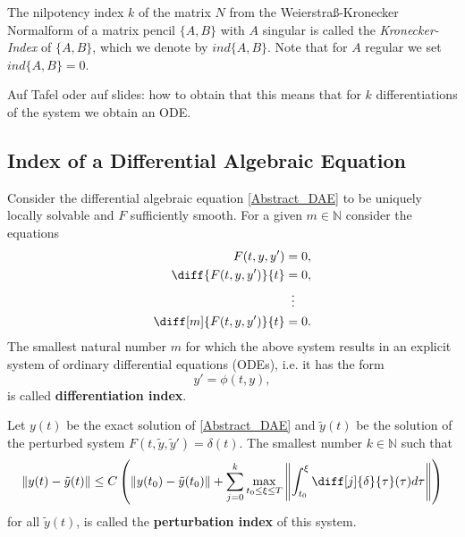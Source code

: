 	\begin{frame}
		\begin{definition}
			The nilpotency index $k$ of the matrix $N$ from the Weierstraß-Kronecker Normalform of a matrix pencil $\{A,B\}$ with $A$ singular is called the \emph{Kronecker-Index} of $\{A,B\}$, which we denote by $ind\{A,B\}$. Note that for $A$ regular we set $ind\{A,B\} = 0$.
		\end{definition}
		
		Auf Tafel oder auf slides: how to obtain that this means that for $k$ differentiations of the system we obtain an ODE.
	\end{frame}
	
	
	
	\subsection{Index of a Differential Algebraic Equation}
	
	\begin{frame}
		\begin{definition}%
			Consider the differential algebraic equation \eqref{Abstract_DAE} to be uniquely locally solvable and $F$ sufficiently smooth. For a given $m \in \mathbb{N}$ consider the equations
			\begin{displaymath}
				\begin{aligned}
					F(t,y,y') &= 0, \\
					\diff{F(t,y,y')}{t} &= 0, \\
					&\vdotswithin{=} \\
					\diff[m]{F(t,y,y')}{t} &= 0.
				\end{aligned}
			\end{displaymath}
			The smallest natural number $m$ for which the above system results in an explicit system of ordinary differential equations (ODEs), i.e. it has the form
			\begin{displaymath}
				y' = \phi(t,y),
			\end{displaymath}
			is called \textbf{differentiation index}.
		\end{definition}
	\end{frame}

	\begin{frame}
		\vfill
		\begin{definition}%
			Let $y(t)$ be the exact solution of \eqref{Abstract_DAE} and $\tilde{y}(t)$ be the solution of the perturbed system $F(t, \tilde{y}, \tilde{y}') = \delta(t)$. The smallest number $k \in \mathbb{N}$ such that 
			\begin{displaymath}
				\|y(t)-\tilde{y}(t)\| \leq C \left(\|y(t_0)-\tilde{y}(t_0)\|+\sum_{j=0}^{k}\max_{t_0 \leq \xi \leq T} \left\rVert 		\int_{t_0}^{\xi}\diff[j]{\delta}{\tau}(\tau)d \tau \right\rVert \right)
			\end{displaymath}
			for all $\tilde{y}(t)$, is called the \textbf{perturbation index} of this system.
		\end{definition}
		\vfill
	\end{frame}

